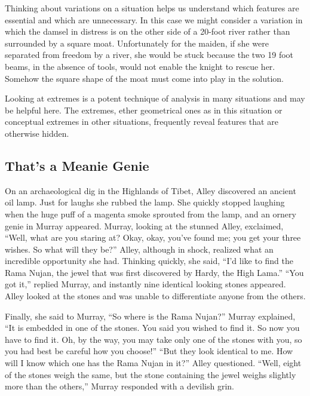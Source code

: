\ifnudges
\hrulefill

Thinking about variations on a situation helps us understand which features are essential and which are unnecessary.  In this case we might consider a variation in which the damsel in distress is on the other side of a 20-foot river rather than surrounded by a square moat.  Unfortunately for the maiden, if she were separated from freedom by a river, she would be stuck because the two 19 foot beams, in the absence of tools, would not enable the knight to rescue her.  Somehow the square shape of the moat must come into play in the solution.

Looking at extremes is a potent technique of analysis in many situations and may be helpful here.  The extremes, ether geometrical ones as in this situation or conceptual extremes in other situations, frequently reveal features that are otherwise hidden.
\fi

\clearpage
\subsection{That's a Meanie Genie}

On an archaeological dig in the Highlands of Tibet, Alley discovered an ancient oil lamp. Just for laughs she rubbed the lamp. She quickly stopped laughing when the huge puff of a magenta smoke sprouted from the lamp, and an ornery genie in Murray appeared. Murray, looking at the stunned Alley, exclaimed, ``Well, what are you staring at? Okay, okay, you've found me; you get your three wishes. So what will they be?'' Alley, although in shock, realized what an incredible opportunity she had. Thinking quickly, she said, ``I'd like to find the Rama Nujan, the jewel that was first discovered by Hardy, the High Lama.'' ``You got it,'' replied Murray, and instantly nine identical looking stones appeared. Alley looked at the stones and was unable to differentiate anyone from the others. 

Finally, she said to Murray, ``So where is the Rama Nujan?'' Murray explained, ``It is embedded in one of the stones. You said you wished to find it. So now you have to find it. Oh, by the way, you may take only one of the stones with you, so you had best be careful how you choose!'' ``But they look identical to me. How will I know which one has the Rama Nujan in it?'' Alley questioned. ``Well, eight of the stones weigh the same, but the stone containing the jewel weighs slightly more than the others,'' Murray responded with a devilish grin.

